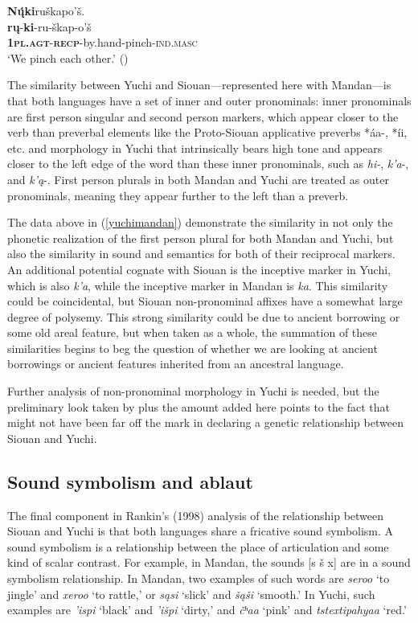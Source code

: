 \documentclass[output=paper]{LSP/langsci}
\begin{document}
{	\ex  
	\glll \textbf{N\k{\'u}ki}ru\v{s}kapo'\v{s}. \\ 
	\textbf{r\k{u}}-\textbf{ki}-ru-\v{s}kap-o'\v{s}\\
			\textbf{\textsc{1pl.agt}}-\textbf{\textsc{recp}}-by.hand-pinch-\textsc{ind.masc}\\ 
	\glt `We pinch each other.' (\citealt[440]{Hollow1970})
\z
\z

The similarity between Yuchi and Siouan---represented here with Mandan---is that both languages have a set of inner and outer pronominals: inner pronominals are first person singular and second person markers, which appear closer to the verb than preverbal elements like the Proto-Siouan applicative preverbs *\'aa-, *\'ii, etc. and morphology in Yuchi that intrinsically bears high tone and appears closer to the left edge of the word than these inner pronominals, such as \emph{hi-}, \emph{k'a}-, and \emph{k'\k{a}}-. First person plurals in both Mandan and Yuchi are treated as outer pronominals, meaning they appear further to the left than a preverb.

The data above in (\ref{yuchimandan}) demonstrate the similarity in not only the phonetic realization of the first person plural for both Mandan and Yuchi, but also the similarity in sound and semantics for both of their reciprocal markers. An additional potential cognate with Siouan is the inceptive marker in Yuchi, which is also \emph{k'a}, while the inceptive marker in Mandan is \emph{ka}. This similarity could be coincidental, but Siouan non-pronominal affixes have a somewhat large degree of polysemy.  This strong similarity could be due to ancient borrowing or some old areal feature, but when taken as a whole, the summation of these similarities begins to beg the question of whether we are looking at ancient borrowings or ancient features inherited from an ancestral language. 

Further analysis of non-pronominal morphology in Yuchi is needed, but the preliminary look taken by \citet{Rankin1998} plus the amount added here points to the fact that \citet{Sapir1929} might not have been far off the mark in declaring a genetic relationship between Siouan and Yuchi.

\subsection{Sound symbolism and ablaut}

The final component in Rankin's (1998) analysis of the relationship between Siouan and Yuchi is that both languages share a fricative sound symbolism. A sound symbolism is a relationship between the place of articulation and some kind of scalar contrast. For example, in Mandan, the sounds [s \v{s} x] are in a sound symbolism relationship. In Mandan, two examples of such words are \emph{seroo} `to jingle' and \emph{xeroo} `to rattle,' or \emph{s\k{a}si} `slick' and \emph{\v{s}\k{a}\v{s}i} `smooth.' In Yuchi, such examples are \emph{'ispi} `black' and \emph{'i\v{s}pi} `dirty,' and \emph{\v{c}ʰa\textbeltl a} `pink' and \emph{tstextipa{\super h}ya\textbeltl a} `red.'

}
\end{document}
